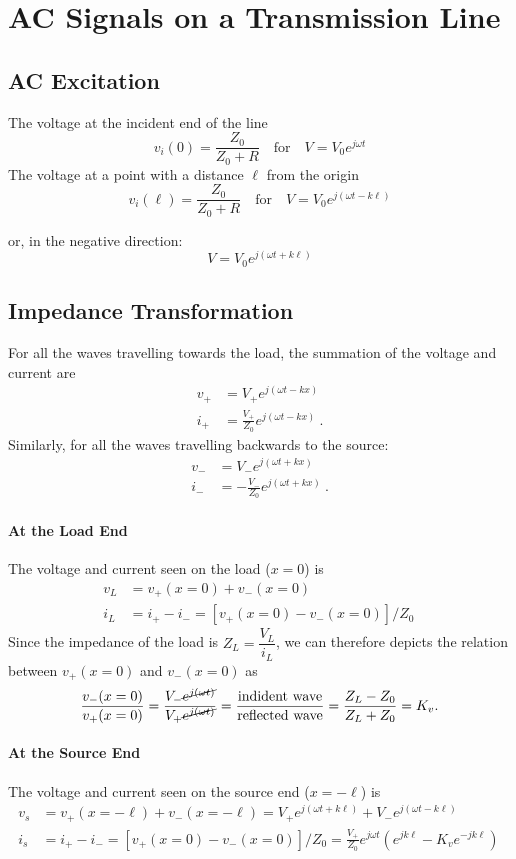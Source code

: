 \documentclass[12pt,a4paper]{article}
\begin{document}
\section{AC Signals on a Transmission Line}
\subsection{AC Excitation}
The voltage at the incident end of the line 
\[
    v_i (0) = \frac{Z_0}{Z_0 + R} \quad \text{for} \quad V = V_0 e^{j \omega t}
\]
The voltage at a point with a distance $\ell$ from the origin
\[
    v_i (\ell) = \frac{Z_0}{Z_0 + R} \quad \text{for} \quad V = V_0 e^{j (\omega t-k \ell)}
\]

or, in the negative direction:
\[
    V = V_0 e^{j (\omega t+k \ell)}
\]

\subsection{Impedance Transformation}
For all the waves travelling towards the load, the summation of the voltage and current are
\begin{align*}
    v_{+} & =  V_{+} e^{j (\omega t - kx)} \\
    i_{+} & = \frac{V_{+}}{Z_0} e^{j (\omega t - kx)} \ .
\end{align*}
Similarly, for all the waves travelling backwards to the source:
\begin{align*}
    v_{-} & =  V_{-} e^{j (\omega t + kx)} \\
    i_{-} & = -\frac{V_{-}}{Z_0} e^{j (\omega t + kx)} \ .
\end{align*}
\paragraph{At the Load End}
The voltage and current seen on the load ($x=0$) is
\begin{align*}
    v_L & = v_{+}(x=0) + v_{-}(x=0) \\
    i_L & = i_{+} - i_{-} = [v_{+}(x=0)-v_{-}(x=0)]/Z_0 \,
\end{align*}
Since the impedance of the load is $ Z_L = \dfrac{V_L}{i_L}$, we can therefore depicts the relation between $v_{+}(x=0)$ and $v_{-}(x=0)$ as
\[
    \dfrac{v_{-} (x=0)}{v_{+} (x=0)} = \frac{V_{-} \cancel{e^{j (\omega t)}}}{V_{+} \cancel{e^{j (\omega t)}}} = \frac{\text{indident wave}}{\text{reflected wave}} = \frac{Z_L - Z_0}{Z_L + Z_0} = K_v.
\]

\paragraph{At the Source End}
The voltage and current seen on the source end ($x=-\ell$) is
\begin{align*}
    v_s & = v_{+}(x=-\ell) + v_{-}(x=-\ell) = V_+ e^{j(\omega t+ k\ell)} + V_{-}e^{j(\omega t-k \ell)} \\
    i_s & = i_{+} - i_{-} = [v_{+}(x=0)-v_{-}(x=0)]/Z_0 = \frac{V_{+}}{Z_0} e^{j\omega t} (e^{jk\ell} - K_v e^{-jk\ell}) \,
\end{align*}
\end{document}
